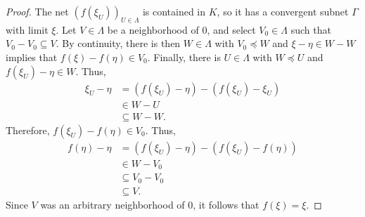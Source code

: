 \documentclass[10pt]{mypackage}
\begin{document}
\begin{proof}
  The net $\left( f\left( \xi_U \right) \right)_{U\in \Lambda}$ is contained in $K$, so it has a convergent subnet $\Gamma$ with limit $\xi$. Let $V\in \Lambda$ be a neighborhood of $0$, and select $V_0\in \Lambda$ such that $V_0 - V_0\subseteq V$. By continuity, there is then $W\in \Lambda$ with $V_0\preceq W$ and $\xi - \eta\in W - W$ implies that $f(\xi) - f(\eta)\in V_0$. Finally, there is $U\in\Lambda$ with $W\preceq U$ and $f\left( \xi_U \right) - \eta\in W$. Thus,
  \begin{align*}
    \xi_U - \eta &= \left( f\left( \xi_U \right) - \eta \right) - \left( f\left( \xi_U \right) - \xi_U \right)\\
                 &\in W - U\\
                 &\subseteq W - W.
  \end{align*}
  Therefore, $f\left( \xi_U \right) - f\left( \eta \right)\in V_0$. Thus,
  \begin{align*}
    f\left( \eta \right) - \eta &= \left( f\left( \xi_U \right) - \eta \right) - \left( f\left( \xi_U \right) - f\left( \eta \right) \right)\\
                                &\in W - V_0\\
                                &\subseteq V_0 - V_0\\
                                &\subseteq V.
  \end{align*}
  Since $V$ was an arbitrary neighborhood of $0$, it follows that $f\left( \xi \right) = \xi$.
\end{proof}
\end{document}
